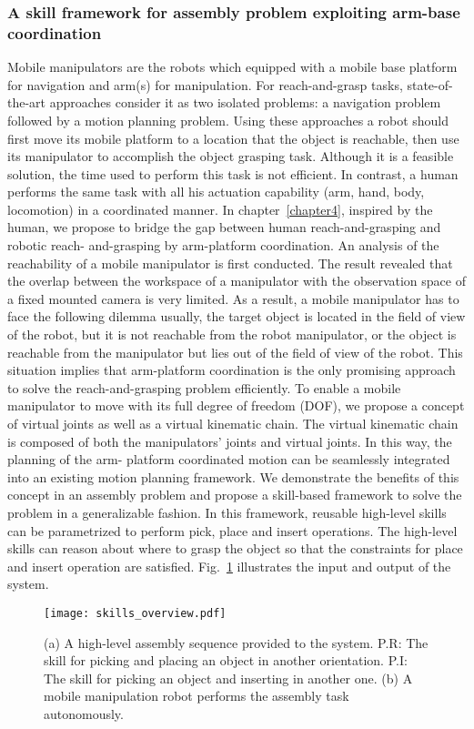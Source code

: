 \subsubsection{A skill framework for assembly problem exploiting arm-base coordination}
Mobile manipulators are the robots which equipped with a mobile base platform 
for navigation and arm(s) for manipulation. For reach-and-grasp tasks, state-of-the-art 
approaches consider it as two isolated problems: a navigation problem followed by a motion 
planning problem. Using these approaches a robot should first move its mobile platform 
to a location that the object is reachable, then use its manipulator to accomplish the object grasping task. Although it is a feasible solution, the time used to perform this task is not efficient. In contrast, a human performs the same task with all his actuation capability (arm, hand, body, locomotion) in a coordinated manner. In chapter~\ref{chapter4}, inspired by the human, we propose to bridge the gap between human reach-and-grasping and robotic reach- 
and-grasping by arm-platform coordination. An analysis of the reachability 
of a mobile manipulator is first conducted. The result revealed that the overlap between 
the workspace of a manipulator with the observation space of a fixed mounted camera is 
very limited. As a result, a mobile manipulator has to  face the following dilemma usually, 
the target object is located in the field of view of the robot, but it is not reachable from 
the robot manipulator, or the object is reachable from the manipulator but lies out of 
the field of view of the robot. This situation implies that arm-platform coordination is the only 
promising approach to solve the reach-and-grasping problem efficiently. To enable a mobile 
manipulator to move with its full degree of freedom (DOF), we propose a concept of 
virtual joints as well as a virtual kinematic chain. The virtual kinematic chain is composed of both the 
manipulators' joints and virtual joints. In this way, the planning of the arm- 
platform coordinated motion can be seamlessly integrated into an existing motion planning 
framework. We demonstrate the benefits of this concept in an assembly problem and propose a skill-based framework to solve the problem in a generalizable fashion. In this framework, reusable high-level skills can be parametrized to perform pick, place and insert operations. The high-level skills can reason about where to grasp the object so that the constraints for place and insert operation are satisfied. Fig.~\ref{fig:skill_over_view} illustrates the input and output of the system.
\begin{figure}[!htbp]
\centering
\texttt{[image: skills\_overview.pdf]}
\captionsetup{justification=raggedright}
\caption{(a) A high-level assembly sequence provided to the system. P.R: The skill for picking and placing an object in another orientation. P.I: The skill for picking an object and inserting in another one. (b) A mobile manipulation robot performs the assembly task autonomously.}
\label{fig:skill_over_view}
\end{figure} 
